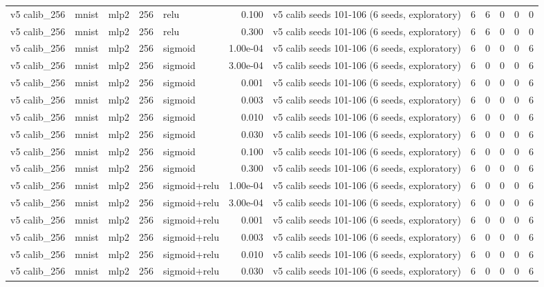 \begin{table}[htbp]
{\begin{tabular}{@{}lllrlrlrrrrr@{}}
v5 calib\_256 & mnist & mlp2 & 256 & relu & 0.100 & v5 calib seeds 101-106 (6 seeds, exploratory) & 6 & 6 & 0 & 0 & 0 \\
v5 calib\_256 & mnist & mlp2 & 256 & relu & 0.300 & v5 calib seeds 101-106 (6 seeds, exploratory) & 6 & 6 & 0 & 0 & 0 \\
v5 calib\_256 & mnist & mlp2 & 256 & sigmoid & 1.00e-04 & v5 calib seeds 101-106 (6 seeds, exploratory) & 6 & 0 & 0 & 0 & 6 \\
v5 calib\_256 & mnist & mlp2 & 256 & sigmoid & 3.00e-04 & v5 calib seeds 101-106 (6 seeds, exploratory) & 6 & 0 & 0 & 0 & 6 \\
v5 calib\_256 & mnist & mlp2 & 256 & sigmoid & 0.001 & v5 calib seeds 101-106 (6 seeds, exploratory) & 6 & 0 & 0 & 0 & 6 \\
v5 calib\_256 & mnist & mlp2 & 256 & sigmoid & 0.003 & v5 calib seeds 101-106 (6 seeds, exploratory) & 6 & 0 & 0 & 0 & 6 \\
v5 calib\_256 & mnist & mlp2 & 256 & sigmoid & 0.010 & v5 calib seeds 101-106 (6 seeds, exploratory) & 6 & 0 & 0 & 0 & 6 \\
v5 calib\_256 & mnist & mlp2 & 256 & sigmoid & 0.030 & v5 calib seeds 101-106 (6 seeds, exploratory) & 6 & 0 & 0 & 0 & 6 \\
v5 calib\_256 & mnist & mlp2 & 256 & sigmoid & 0.100 & v5 calib seeds 101-106 (6 seeds, exploratory) & 6 & 0 & 0 & 0 & 6 \\
v5 calib\_256 & mnist & mlp2 & 256 & sigmoid & 0.300 & v5 calib seeds 101-106 (6 seeds, exploratory) & 6 & 0 & 0 & 0 & 6 \\
v5 calib\_256 & mnist & mlp2 & 256 & sigmoid+relu & 1.00e-04 & v5 calib seeds 101-106 (6 seeds, exploratory) & 6 & 0 & 0 & 0 & 6 \\
v5 calib\_256 & mnist & mlp2 & 256 & sigmoid+relu & 3.00e-04 & v5 calib seeds 101-106 (6 seeds, exploratory) & 6 & 0 & 0 & 0 & 6 \\
v5 calib\_256 & mnist & mlp2 & 256 & sigmoid+relu & 0.001 & v5 calib seeds 101-106 (6 seeds, exploratory) & 6 & 0 & 0 & 0 & 6 \\
v5 calib\_256 & mnist & mlp2 & 256 & sigmoid+relu & 0.003 & v5 calib seeds 101-106 (6 seeds, exploratory) & 6 & 0 & 0 & 0 & 6 \\
v5 calib\_256 & mnist & mlp2 & 256 & sigmoid+relu & 0.010 & v5 calib seeds 101-106 (6 seeds, exploratory) & 6 & 0 & 0 & 0 & 6 \\
v5 calib\_256 & mnist & mlp2 & 256 & sigmoid+relu & 0.030 & v5 calib seeds 101-106 (6 seeds, exploratory) & 6 & 0 & 0 & 0 & 6 \\

\end{tabular}}
\end{table}
